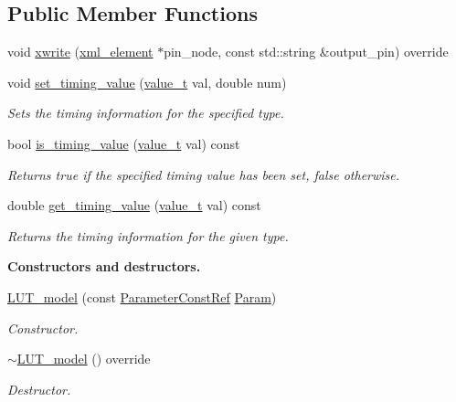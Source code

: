 \subsection*{Public Member Functions}
\begin{DoxyCompactItemize}
\item 
void \hyperlink{classLUT__model_a425bc1c19bd99c0b0817051ce78db81f}{xwrite} (\hyperlink{classxml__element}{xml\+\_\+element} $\ast$pin\+\_\+node, const std\+::string \&output\+\_\+pin) override
\item 
void \hyperlink{classLUT__model_a13703801f1310ad9f4f41568877bb2ac}{set\+\_\+timing\+\_\+value} (\hyperlink{classLUT__model_a863cc03b53b14df7344ada5a1bed2b20}{value\+\_\+t} val, double num)
\begin{DoxyCompactList}\small\item\em Sets the timing information for the specified type. \end{DoxyCompactList}\item 
bool \hyperlink{classLUT__model_a9133ca4602d0a2470a5b47916e649d59}{is\+\_\+timing\+\_\+value} (\hyperlink{classLUT__model_a863cc03b53b14df7344ada5a1bed2b20}{value\+\_\+t} val) const
\begin{DoxyCompactList}\small\item\em Returns true if the specified timing value has been set, false otherwise. \end{DoxyCompactList}\item 
double \hyperlink{classLUT__model_a36109f570f043a338845fe6a4ab29e87}{get\+\_\+timing\+\_\+value} (\hyperlink{classLUT__model_a863cc03b53b14df7344ada5a1bed2b20}{value\+\_\+t} val) const
\begin{DoxyCompactList}\small\item\em Returns the timing information for the given type. \end{DoxyCompactList}\end{DoxyCompactItemize}
\begin{Indent}\textbf{ Constructors and destructors.}\par
\begin{DoxyCompactItemize}
\item 
\hyperlink{classLUT__model_a1ba8b7a2d18eefa7e12cd2be92d212b2}{L\+U\+T\+\_\+model} (const \hyperlink{Parameter_8hpp_a37841774a6fcb479b597fdf8955eb4ea}{Parameter\+Const\+Ref} \hyperlink{classtime__model_adfd18786156118b7467cef8117933674}{Param})
\begin{DoxyCompactList}\small\item\em Constructor. \end{DoxyCompactList}\item 
\hyperlink{classLUT__model_a2c3cebbb4524c36b95d954cc2f774eaf}{$\sim$\+L\+U\+T\+\_\+model} () override
\begin{DoxyCompactList}\small\item\em Destructor. \end{DoxyCompactList}\end{DoxyCompactItemize}
\end{Indent}
